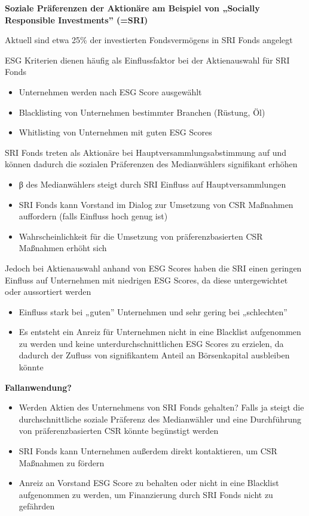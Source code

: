 \documentclass[
]{article}
\providecommand{\tightlist}{%
  \setlength{\itemsep}{0pt}\setlength{\parskip}{0pt}}
\begin{document}
\textbf{Soziale Präferenzen der Aktionäre am Beispiel von „Socially
Responsible Investments'' (=SRI)}

Aktuell sind etwa 25\% der investierten Fondsvermögens in SRI Fonds
angelegt

ESG Kriterien dienen häufig als Einflussfaktor bei der Aktienauswahl für
SRI Fonds

\begin{itemize}
\tightlist
\item
  Unternehmen werden nach ESG Score ausgewählt
\item
  Blacklisting von Unternehmen bestimmter Branchen (Rüstung, Öl)
\item
  Whitlisting von Unternehmen mit guten ESG Scores
\end{itemize}

SRI Fonds treten als Aktionäre bei Hauptversammlungsabstimmung auf und
können dadurch die sozialen Präferenzen des Medianwählers signifikant
erhöhen

\begin{itemize}
\tightlist
\item
  β des Medianwählers steigt durch SRI Einfluss auf Hauptversammlungen
\item
  SRI Fonds kann Vorstand im Dialog zur Umsetzung von CSR Maßnahmen
  auffordern (falls Einfluss hoch genug ist)
\item
  Wahrscheinlichkeit für die Umsetzung von präferenzbasierten CSR
  Maßnahmen erhöht sich
\end{itemize}

Jedoch bei Aktienauswahl anhand von ESG Scores haben die SRI einen
geringen Einfluss auf Unternehmen mit niedrigen ESG Scores, da diese
untergewichtet oder aussortiert werden

\begin{itemize}
\tightlist
\item
  Einfluss stark bei „guten'' Unternehmen und sehr gering bei
  „schlechten''
\item
  Es entsteht ein Anreiz für Unternehmen nicht in eine Blacklist
  aufgenommen zu werden und keine unterdurchschnittlichen ESG Scores zu
  erzielen, da dadurch der Zufluss von signifikantem Anteil an
  Börsenkapital ausbleiben könnte
\end{itemize}

\textbf{Fallanwendung?}

\begin{itemize}
\tightlist
\item
  Werden Aktien des Unternehmens von SRI Fonds gehalten? Falls ja steigt
  die durchschnittliche soziale Präferenz des Medianwähler und eine
  Durchführung von präferenzbasierten CSR könnte begünstigt werden
\item
  SRI Fonds kann Unternehmen außerdem direkt kontaktieren, um CSR
  Maßnahmen zu fördern
\item
  Anreiz an Vorstand ESG Score zu behalten oder nicht in eine Blacklist
  aufgenommen zu werden, um Finanzierung durch SRI Fonds nicht zu
  gefährden
\end{itemize}
\end{document}
